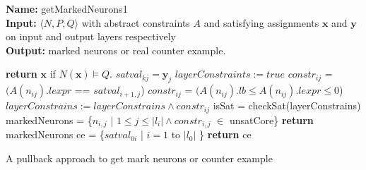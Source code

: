 \begin{algorithm}[t]
  \textbf{Name: } getMarkedNeurons1 \\
  \textbf{Input: } $\langle N,P,Q \rangle$ with abstract constraints $A$ and satisfying assignments $\boldsymbol{x}$ and $\boldsymbol{y}$ on input and output layers respectively\\
  \textbf{Output: } marked neurons or real counter example. 
  \begin{algorithmic}[1]
    \State \textbf{return} $\boldsymbol{x}$ if $N(\boldsymbol{x}) \models Q$. 
    \State $satval_{kj} = \boldsymbol{y}_j$
   \EndFor
        \State $layerConstraints := true$
            \State $constr_{ij}$ = $(A(n_{ij}).lexpr$ == $satval_{i+1,j}$) 
          \Else
            \State $constr_{ij}$ = $(A(n_{ij}).lb \leq A(n_{ij}).lexpr \leq 0$)
          \EndIf
          \State $layerConstrains := layerConstrains \land constr_{ij}$
        \EndFor
        \State isSat = checkSat(layerConstrains)
          \State markedNeurons = \{$n_{i,j}$ | $1 \leq j\leq |l_i| \land constr_{i,j}$ $\in$ unsatCore\}
          \State \textbf{return } markedNeurons
        \EndIf
      \EndIf
   \EndFor
    \State ce = \{$satval_{0i}$ | $i=1$ to $|l_0|$ \} 
    \State \textbf{return} ce
  \end{algorithmic}
  \caption{A pullback approach to get mark neurons or counter example}
  \label{algo:refine1}
\end{algorithm}



